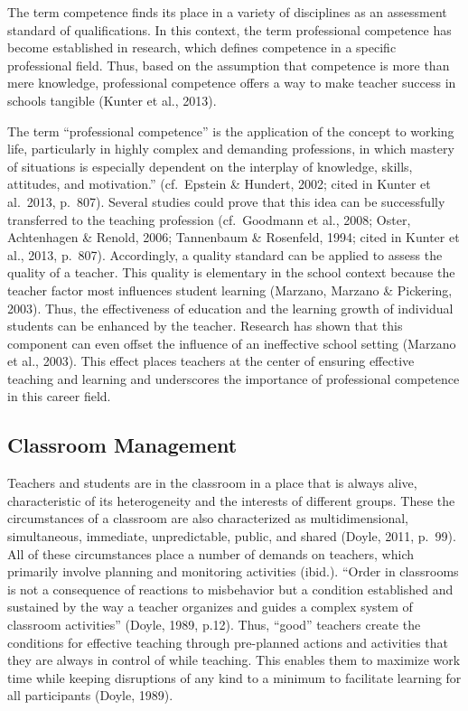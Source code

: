 \documentclass[
  man]{apa6}
\begin{document}
The term competence finds its place in a variety of disciplines as an assessment standard of qualifications. In this context, the term professional competence has become established in research, which defines competence in a specific professional field. Thus, based on the assumption that competence is more than mere knowledge, professional competence offers a way to make teacher success in schools tangible (Kunter et al., 2013).

The term ``professional competence'' is the application of the concept to working life, particularly in highly complex and demanding professions, in which mastery of situations is especially dependent on the interplay of knowledge, skills, attitudes, and motivation.'' (cf.~Epstein \& Hundert, 2002; cited in Kunter et al.~2013, p.~807). Several studies could prove that this idea can be successfully transferred to the teaching profession (cf.~Goodmann et al., 2008; Oster, Achtenhagen \& Renold, 2006; Tannenbaum \& Rosenfeld, 1994; cited in Kunter et al., 2013, p.~807). Accordingly, a quality standard can be applied to assess the quality of a teacher. This quality is elementary in the school context because the teacher factor most influences student learning (Marzano, Marzano \& Pickering, 2003). Thus, the effectiveness of education and the learning growth of individual students can be enhanced by the teacher. Research has shown that this component can even offset the influence of an ineffective school setting (Marzano et al., 2003). This effect places teachers at the center of ensuring effective teaching and learning and underscores the importance of professional competence in this career field.

\hypertarget{classroom-management}{%
\subsection{Classroom Management}\label{classroom-management}}

Teachers and students are in the classroom in a place that is always alive, characteristic of its heterogeneity and the interests of different groups. These the circumstances of a classroom are also characterized as multidimensional, simultaneous, immediate, unpredictable, public, and shared (Doyle, 2011, p.~99). All of these circumstances place a number of demands on teachers, which primarily involve planning and monitoring activities (ibid.). ``Order in classrooms is not a consequence of reactions to misbehavior but a condition established and sustained by the way a teacher organizes and guides a complex system of classroom activities'' (Doyle, 1989, p.12). Thus, ``good'' teachers create the conditions for effective teaching through pre-planned actions and activities that they are always in control of while teaching. This enables them to maximize work time while keeping disruptions of any kind to a minimum to facilitate learning for all participants (Doyle, 1989).
\end{document}
